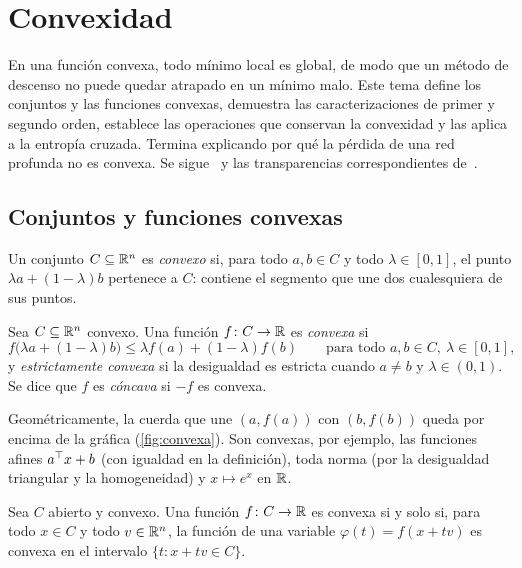 \chapter{Convexidad}
\label{tema:5}

En una función convexa, todo mínimo local es global, de modo que un método de descenso no puede quedar atrapado en un mínimo malo. Este tema define los conjuntos y las funciones convexas, demuestra las caracterizaciones de primer y segundo orden, establece las operaciones que conservan la convexidad y las aplica a la entropía cruzada. Termina explicando por qué la pérdida de una red profunda no es convexa. Se sigue~\cite[§3.1, §3.2 y §4.2]{bv} y las transparencias correspondientes de~\cite{ee364a}.

\section{Conjuntos y funciones convexas}

\begin{definicion}
Un conjunto $C\subseteq\mathbb{R}^{n}$ es \emph{convexo} si, para todo $a,b\in C$ y todo $\lambda\in[0,1]$, el punto $\lambda a+(1-\lambda)b$ pertenece a $C$: contiene el segmento que une dos cualesquiera de sus puntos.
\end{definicion}

\begin{definicion}\label{def:convexa}
Sea $C\subseteq\mathbb{R}^{n}$ convexo. Una función $f\colon C\to\mathbb{R}$ es \emph{convexa} si
\[
f\bigl(\lambda a+(1-\lambda)b\bigr)\le\lambda f(a)+(1-\lambda)f(b)\qquad\text{para todo } a,b\in C,\ \lambda\in[0,1],
\]
y \emph{estrictamente convexa} si la desigualdad es estricta cuando $a\ne b$ y $\lambda\in(0,1)$. Se dice que $f$ es \emph{cóncava} si $-f$ es convexa.
\end{definicion}

Geométricamente, la cuerda que une $(a,f(a))$ con $(b,f(b))$ queda por encima de la gráfica (\cref{fig:convexa}). Son convexas, por ejemplo, las funciones afines $a^{\top} x+b$ (con igualdad en la definición), toda norma (por la desigualdad triangular y la homogeneidad) y $x\mapsto e^{x}$ en $\mathbb{R}$.

\addtocounter{figure}{1}%

\begin{lema}\label{lem:rectas}
Sea $C$ abierto y convexo. Una función $f\colon C\to\mathbb{R}$ es convexa si y solo si, para todo $x\in C$ y todo $v\in\mathbb{R}^{n}$, la función de una variable $\varphi(t)=f(x+tv)$ es convexa en el intervalo $\{t:x+tv\in C\}$.
\end{lema}

